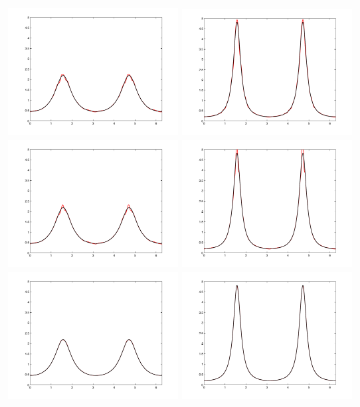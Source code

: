 \documentclass[letterpaper, 12 pt]{amsart}
\begin{document}
\begin{figure}[p]
  \centering
  \includegraphics[width=0.4\textwidth]{./images/S1Wavelet_sf4nBases88scale1T1.pdf}
  \includegraphics[width=0.4\textwidth]{./images/S1Wavelet_sf4nBases88scale1T2.pdf}
  \includegraphics[width=0.4\textwidth]{./images/S1Wavelet_sf4nBases160scale2T1.pdf}
  \includegraphics[width=0.4\textwidth]{./images/S1Wavelet_sf4nBases160scale2T2.pdf}
  \includegraphics[width=0.4\textwidth]{./images/S1Wavelet_sf6nBases100scale1T1.pdf}
  \includegraphics[width=0.4\textwidth]{./images/S1Wavelet_sf6nBases100scale1T2.pdf}

\end{figure}
\end{document}

